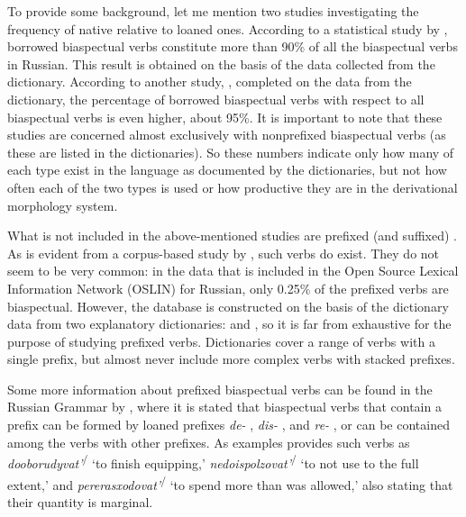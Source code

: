 To provide some background, let me mention two studies investigating the frequency of native  relative to loaned    ones. According to a statistical study by \citet{Certkova:98}, borrowed biaspectual verbs    constitute more than 90\% of all the biaspectual verbs  in Russian. This result is obtained on the basis of the data collected from the \citet{Ozegov:90} dictionary. According to another study, \citet{Anderson:02}, completed on the data from the \citet{Zaliznjak:77} dictionary, the percentage of borrowed biaspectual verbs    with respect to all biaspectual verbs  is even higher, about 95\%. It is important to note that these studies are concerned almost exclusively with nonprefixed biaspectual verbs  (as these are listed in the dictionaries). So these numbers indicate only how many  of each type exist in the language as documented by the dictionaries, but not how often each of the two types is used or how productive they are in the derivational morphology system.

What is not included in the above-mentioned studies are prefixed (and suffixed) . As is evident from a corpus-based study by \citet{Borik:12}, such verbs do exist. They do not seem to be very common: in the data that is included in the Open Source Lexical Information Network (OSLIN) for Russian, only 0.25\% of the prefixed verbs are biaspectual. However, the database is constructed on the basis of the dictionary data from two explanatory dictionaries: \citet{Ushakov:50} and \citet{OzegovShvedova:92}, so it is far from exhaustive for the purpose of studying prefixed verbs. Dictionaries cover a range of verbs with a single prefix, but almost never include more complex verbs  with stacked prefixes. 

Some more information about prefixed biaspectual verbs   can be found in the Russian Grammar by \citet{Shvedova:82}, where it is stated that biaspectual verbs  that contain a prefix can be formed by loaned   prefixes \textit {de-}  , \textit {dis-}  , and \textit{re-}  , or can be contained among the verbs with other prefixes. As examples \citet{Shvedova:82} provides such verbs as  \textit{dooborudyvat'}\textsuperscript{\IPF\slash\PF} `to finish equipping,' \textit{nedoispolzovat'}\textsuperscript{\IPF\slash\PF} `to not use to the full extent,' and \textit{pererasxodovat'}\textsuperscript{\IPF\slash\PF} `to spend more than was allowed,' also stating that their quantity is marginal. 


